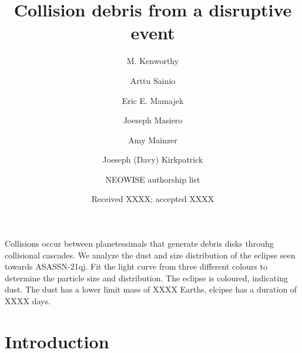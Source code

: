 \documentclass{aa}
\begin{document}
 

   \title{Collision debris from a disruptive event}

   \author{M. Kenworthy
          \and
          Arttu Sainio
          \and
          Eric E. Mamajek
          \and
          Joeseph Masiero
          \and 
          Amy Mainzer
          \and
          Joeseph (Davy) Kirkpatrick
          \and 
          NEOWISE authorship list
          }


   \date{Received XXXX; accepted XXXX}

 
  \abstract
   {Collisions occur between planetessimals that generate debris disks throuhg collisional cascades.}
   {We analyze the dust and size distribution of the eclipse seen towards ASASSN-21qj.}
   {Fit the light curve from three different colours to determine the particle size and distribution.}
   {The eclipse is coloured, indicating dust.
   The dust has a lower limit mass of XXXX Earths, elcipse has a duration of XXXX days.}
   {}


   \maketitle
%

   \section{Introduction}
\end{document}
